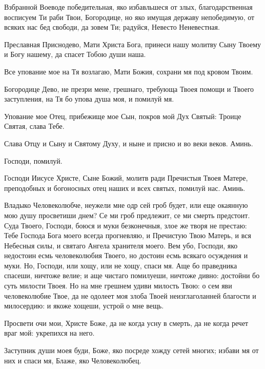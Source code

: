 \begin{mymulticols}

Взбранной Воеводе победительная, яко избавльшеся от злых, благодарственная восписуем Ти раби Твои, Богородице, но яко имущая державу непобедимую, от всяких нас бед свободи, да зовем Ти; радуйся, Невесто Неневестная.

Преславная Приснодево, Мати Христа Бога, принеси нашу молитву Сыну Твоему и Богу нашему, да спасет Тобою души наша.

Все упование мое на Тя возлагаю, Мати Божия, сохрани мя под кровом Твоим.

Богородице Дево, не презри мене, грешнаго, требующа Твоея помощи и Твоего заступления, на Тя бо упова душа моя, и помилуй мя.


Упование мое Отец, прибежище мое Сын, покров мой Дух Святый: Троице Святая, слава Тебе.

\Chestneyshuyu

Слава Отцу и Сыну и Святому Духу, и ныне и присно и во веки веков. Аминь.

Господи, помилуй. 

Господи Иисусе Христе, Сыне Божий, молитв ради Пречистыя Твоея Матере, преподобных и богоносных отец наших и всех святых, помилуй нас. Аминь.


Владыко Человеколюбче, неужели мне одр сей гроб будет, или еще окаянную мою душу просветиши днем? Се ми гроб предлежит, се ми смерть предстоит. Суда Твоего, Господи, боюся и муки безконечныя, злое же творя не престаю: Тебе Господа Бога моего всегда прогневляю, и Пречистую Твою Матерь, и вся Небесныя силы, и святаго Ангела хранителя моего. Вем убо, Господи, яко недостоин есмь человеколюбия Твоего, но достоин есмь всякаго осуждения и муки. Но, Господи, или хощу, или не хощу, спаси мя. Аще бо праведника спасеши, ничтоже велие; и аще чистаго помилуеши, ничтоже дивно: достойни бо суть милости Твоея. Но на мне грешнем удиви милость Твою: о сем яви человеколюбие Твое, да не одолеет моя злоба Твоей неизглаголанней благости и милосердию: и якоже хощеши, устрой о мне вещь.

Просвети очи мои, Христе Боже, да не когда усну в смерть, да не когда речет враг мой: укрепихся на него.

\slavan

 Заступник души моея буди, Боже, яко посреде хожду сетей многих; избави мя от них и спаси мя, Блаже, яко Человеколюбец.


\end{mymulticols}
